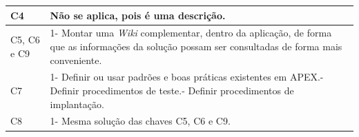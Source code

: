 \begin{longtable}{|M{2.0cm}|m{13.0cm}|}
C4                                               & Não se aplica, pois é uma descrição.                                                                                                                                                                                                                                                                                                                                                                                                                                                                                                                           \\ \hline
C5, C6 e C9                                      & 1- Montar uma \textit{Wiki} complementar, dentro da aplicação, de forma que as informações da solução possam ser consultadas de forma mais conveniente.                                                                                                                                                                                                                                                                                                                                                                                                         \\ \hline
C7                                                & 1- Definir ou usar padrões e boas práticas existentes em APEX.- Definir procedimentos de teste.- Definir procedimentos de implantação.                                                                                                                                                                                                                                                                                                                                                                        \\ \hline
C8                                                & 1- Mesma solução das chaves C5, C6 e C9.                                                                                                                                                                                                                                                                                                                                                                                                                                                                                                                 \\ \hline

\end{longtable}
